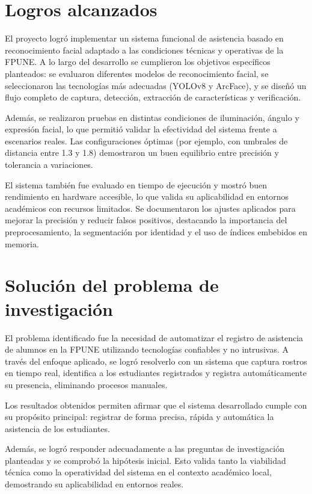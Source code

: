 \section{Logros alcanzados}

El proyecto logró implementar un sistema funcional de asistencia basado en reconocimiento facial adaptado a las condiciones técnicas y operativas de la FPUNE. A lo largo del desarrollo se cumplieron los objetivos específicos planteados: se evaluaron diferentes modelos de reconocimiento facial, se seleccionaron las tecnologías más adecuadas (YOLOv8 y ArcFace), y se diseñó un flujo completo de captura, detección, extracción de características y verificación.

Además, se realizaron pruebas en distintas condiciones de iluminación, ángulo y expresión facial, lo que permitió validar la efectividad del sistema frente a escenarios reales. Las configuraciones óptimas (por ejemplo, con umbrales de distancia entre 1.3 y 1.8) demostraron un buen equilibrio entre precisión y tolerancia a variaciones.

El sistema también fue evaluado en tiempo de ejecución y mostró buen rendimiento en hardware accesible, lo que valida su aplicabilidad en entornos académicos con recursos limitados. Se documentaron los ajustes aplicados para mejorar la precisión y reducir falsos positivos, destacando la importancia del preprocesamiento, la segmentación por identidad y el uso de índices embebidos en memoria.

\section{Solución del problema de investigación}

El problema identificado fue la necesidad de automatizar el registro de asistencia de alumnos en la FPUNE utilizando tecnologías confiables y no intrusivas. A través del enfoque aplicado, se logró resolverlo con un sistema que captura rostros en tiempo real, identifica a los estudiantes registrados y registra automáticamente su presencia, eliminando procesos manuales.

Los resultados obtenidos permiten afirmar que el sistema desarrollado cumple con su propósito principal: registrar de forma precisa, rápida y automática la asistencia de los estudiantes.

Además, se logró responder adecuadamente a las preguntas de investigación planteadas y se comprobó la hipótesis inicial. Esto valida tanto la viabilidad técnica como la operatividad del sistema en el contexto académico local, demostrando su aplicabilidad en entornos reales.

